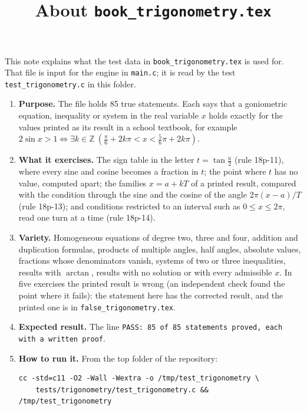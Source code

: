 \documentclass[11pt,a4paper]{article}
\title{About \texttt{book\_trigonometry.tex}}
\author{}
\date{}
\begin{document}
\maketitle
This note explains what the test data in \texttt{book\_trigonometry.tex} is used for. That file is input for the engine in \texttt{main.c}; it is read by the test \texttt{test\_trigonometry.c} in this folder.

\begin{enumerate}
\item \textbf{Purpose.} The file holds 85 true statements. Each says that a goniometric equation, inequality or system in the real variable $x$ holds exactly for the values printed as its result in a school textbook, for example $2\sin x > 1 \iff \exists k \in \mathbb{Z}\ \left(\frac{\pi}{6} + 2k\pi < x < \frac{5}{6}\pi + 2k\pi\right)$.

\item \textbf{What it exercises.} The sign table in the letter $t = \tan\frac{u}{2}$ (rule 18p-11), where every sine and cosine becomes a fraction in $t$; the point where $t$ has no value, computed apart; the families $x = a + kT$ of a printed result, compared with the condition through the sine and the cosine of the angle $2\pi(x - a)/T$ (rule 18p-13); and conditions restricted to an interval such as $0 \le x \le 2\pi$, read one turn at a time (rule 18p-14).

\item \textbf{Variety.} Homogeneous equations of degree two, three and four, addition and duplication formulas, products of multiple angles, half angles, absolute values, fractions whose denominators vanish, systems of two or three inequalities, results with $\arctan$, results with no solution or with every admissible $x$. In five exercises the printed result is wrong (an independent check found the point where it fails): the statement here has the corrected result, and the printed one is in \texttt{false\_trigonometry.tex}.

\item \textbf{Expected result.} The line \texttt{PASS: 85 of 85 statements proved, each with a written proof}.

\item \textbf{How to run it.} From the top folder of the repository:
\begin{verbatim}
cc -std=c11 -O2 -Wall -Wextra -o /tmp/test_trigonometry \
    tests/trigonometry/test_trigonometry.c && /tmp/test_trigonometry
\end{verbatim}
\end{enumerate}
\end{document}
